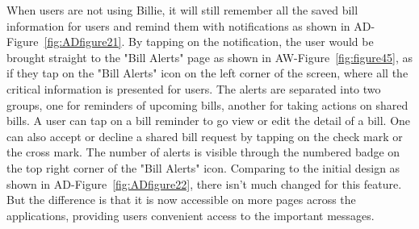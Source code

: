 \documentclass{sigchi}
\begin{document}
When users are not using Billie, it will still remember all the saved bill information for users and remind them with notifications as shown in AD-Figure~\ref{fig:ADfigure21}. By tapping on the notification, the user would be brought straight to the "Bill Alerts" page as shown in AW-Figure~\ref{fig:figure45}, as if they tap on the "Bill Alerts" icon on the left corner of the screen, where all the critical information is presented for users. The alerts are separated into two groups, one for reminders of upcoming bills, another for taking actions on shared bills. A user can tap on a bill reminder to go view or edit the detail of a bill. One can also accept or decline a shared bill request by tapping on the check mark or the cross mark. The number of alerts is visible through the numbered badge on the top right corner of the "Bill Alerts" icon. Comparing to the initial design as shown in AD-Figure~\ref{fig:ADfigure22}, there isn't much changed for this feature. But the difference is that it is now accessible on more pages across the applications, providing users convenient access to the important messages.
\end{document}
